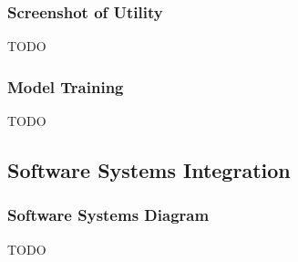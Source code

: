 \documentclass[11pt, twoside]{report}
\begin{document}
\subsubsection{Screenshot of Utility} \label{app:util}
	\begin{center}
	TODO
	\end{center}

\subsubsection{Model Training} \label{app:model}
	\begin{center}
	TODO
	\end{center}


\subsection{Software Systems Integration} \label{app:system}
\subsubsection{Software Systems Diagram} \label{app:sysdiag}
	\begin{center}
	TODO
	\end{center}
	
\end{document}
